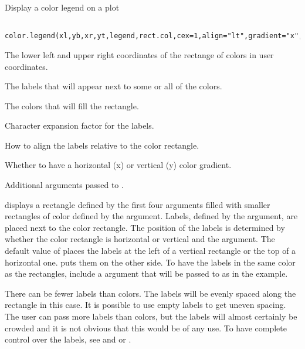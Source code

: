 \begin{Description}\relax
Display a color legend on a plot
\end{Description}
\begin{Usage}
\begin{verbatim}
 color.legend(xl,yb,xr,yt,legend,rect.col,cex=1,align="lt",gradient="x",...)
\end{verbatim}
\end{Usage}
\begin{Arguments}
\begin{ldescription}
\item[\code{xl,yb,xr,yt}] The lower left and upper right coordinates of the
rectange of colors in user coordinates.
\item[\code{legend}] The labels that will appear next to some or all of the colors.
\item[\code{rect.col}] The colors that will fill the rectangle.
\item[\code{cex}] Character expansion factor for the labels.
\item[\code{align}] How to align the labels relative to the color rectangle.
\item[\code{gradient}] Whether to have a horizontal (x) or vertical (y) color
gradient.
\item[\code{...}] Additional arguments passed to .
\end{ldescription}
\end{Arguments}
\begin{Details}\relax
{} displays a rectangle defined by the first four arguments
filled with smaller rectangles of color defined by the  argument.
Labels, defined by the  argument, are placed next to the color
rectangle. The position of the labels is determined by whether the color
rectangle is horizontal or vertical and the  argument. The default
value of  places the labels at the left of a vertical rectangle or the
top of a horizontal one.  puts them on the other side. To have the
labels in the same color as the rectangles, include a  argument that
will be passed to  as in the example.

There can be fewer labels than colors. The labels will be evenly spaced along
the rectangle in this case. It is possible to use empty labels to get uneven
spacing. The user can pass more labels than colors, but the labels will almost
certainly be crowded and it is not obvious that this would be of any use. To
have complete control over the labels, see  and 
 or .
\end{Details}
